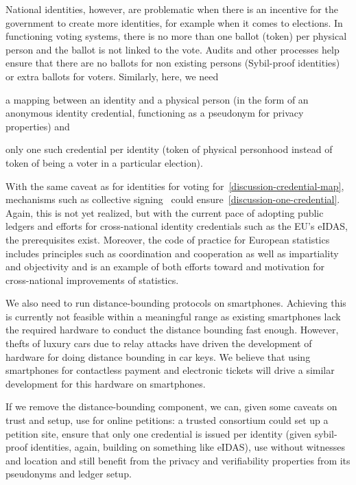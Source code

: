 National identities, however, are problematic when there is an
incentive for the government to create more identities, for example
when it comes to elections.  In functioning voting systems, there is
no more than one ballot (token) per physical person and the ballot is
not linked to the vote. Audits and other processes help ensure that
there are no ballots for non existing persons (Sybil-proof identities)
or extra ballots for voters. Similarly, here, we need
\begin{enumerate*}
\item\label{discussion-credential-map} a mapping between an identity and a 
  physical person (in the form of an anonymous identity credential, functioning 
  as a pseudonym for privacy
properties) and
\item\label{discussion-one-credential} only one such credential per identity 
  (token of physical personhood instead of token of being a voter in a 
  particular election).
\end{enumerate*}
With the same caveat as for identities for voting 
for~\ref{discussion-credential-map}, mechanisms such as collective 
signing~\cite{collective-signing} could ensure~\ref{discussion-one-credential}.
Again, this is not yet realized, but with the current pace
of adopting public ledgers and efforts for cross-national identity
credentials such as the EU's eIDAS, the prerequisites exist. Moreover,
the code of practice for European statistics~\cite{EuroStat} includes 
principles such as coordination and cooperation as well as
impartiality and objectivity and is an example of both efforts toward
and motivation for cross-national improvements of statistics.


We also need to run distance-bounding protocols on smartphones.
Achieving this is currently not feasible within a meaningful range as
existing smartphones lack the required hardware to conduct the
distance bounding fast enough.  However, thefts of luxury cars due to
relay attacks have driven the development of hardware for doing
distance bounding in car keys.  We believe that using smartphones for
contactless payment and electronic tickets will drive a similar
development for this hardware on smartphones.

If we remove the distance-bounding component, we can, given some
caveats on trust and setup, use \CROCUS for online petitions: a
trusted consortium could set up a petition site, ensure that only one
credential is issued per identity (given sybil-proof identities,
again, building on something like eIDAS), use \CROCUS without
witnesses and location and still benefit from the privacy and
verifiability properties from its pseudonyms and ledger setup.


